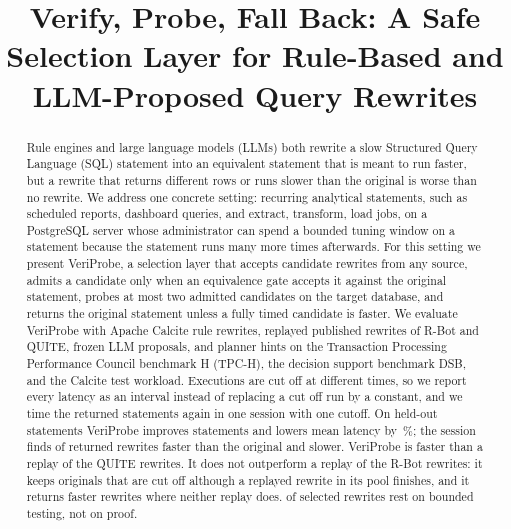 \documentclass[conference]{IEEEtran}
\newcommand{\sys}{VeriProbe}
\newcommand{\pc}[1]{#1\,\%}
\begin{document}
\title{Verify, Probe, Fall Back: A Safe Selection Layer for Rule-Based and LLM-Proposed Query Rewrites}

\author{
}

\maketitle

\begin{abstract}
Rule engines and large language models (LLMs) both rewrite a slow Structured Query Language (SQL) statement into an equivalent statement that is meant to run faster, but a rewrite that returns different rows or runs slower than the original is worse than no rewrite.
We address one concrete setting: recurring analytical statements, such as scheduled reports, dashboard queries, and extract, transform, load jobs, on a PostgreSQL server whose administrator can spend a bounded tuning window on a statement because the statement runs many more times afterwards.
For this setting we present \sys{}, a selection layer that accepts candidate rewrites from any source, admits a candidate only when an equivalence gate accepts it against the original statement, probes at most two admitted candidates on the target database, and returns the original statement unless a fully timed candidate is faster.
We evaluate \sys{} with Apache Calcite rule rewrites, replayed published rewrites of R-Bot and QUITE, frozen LLM proposals, and planner hints on the Transaction Processing Performance Council benchmark H (TPC-H), the decision support benchmark DSB, and the Calcite test workload.
Executions are cut off at different times, so we report every latency as an interval instead of replacing a cut off run by a constant, and we time the returned statements again in one session with one cutoff.
On \HeldAllN{} held-out statements \sys{} improves \HeldAllOursFaster{} statements and lowers mean latency by \pc{\HeldAllOursRedU}; the session finds \ValHeldAllOursFaster{} of \ValHeldAllOursRewrites{} returned rewrites faster than the original and \ValHeldAllOursSlower{} slower.
\sys{} is faster than a replay of the QUITE rewrites.
It does not outperform a replay of the R-Bot rewrites: it keeps \ValHeldAllMissedOrigCutOff{} originals that are cut off although a replayed rewrite in its pool finishes, and it returns \ValHeldAllOursOnly{} faster rewrites where neither replay does.
\AllEvDifferential{} of \AllSelected{} selected rewrites rest on bounded testing, not on proof.
\end{abstract}
\end{document}
